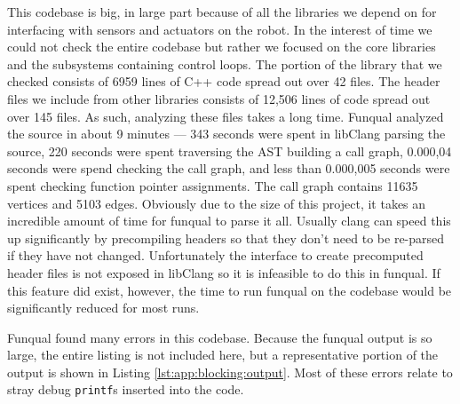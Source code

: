 This codebase is big, in large part because of all the libraries we depend on for interfacing with sensors and actuators on the robot.  In the interest of time we could not check the entire codebase but rather we focused on the core libraries and the subsystems containing control loops.  The portion of the library that we checked consists of 6959 lines of C++ code spread out over 42 files.  The header files we include from other libraries consists of 12,506 lines of code spread out over 145 files.  As such, analyzing these files takes a long time.  Funqual analyzed the source in about 9 minutes --- 343 seconds were spent in libClang parsing the source, 220 seconds were spent traversing the AST building a call graph, 0.000,04 seconds were spend checking the call graph, and less than 0.000,005 seconds were spent checking function pointer assignments.  The call graph contains 11635 vertices and 5103 edges.  Obviously due to the size of this project, it takes an incredible amount of time for funqual to parse it all.  Usually clang can speed this up significantly by precompiling headers so that they don't need to be re-parsed if they have not changed.  Unfortunately the interface to create precomputed header files is not exposed in libClang so it is infeasible to do this in funqual.  If this feature did exist, however, the time to run funqual on the codebase would be significantly reduced for most runs.

Funqual found many errors in this codebase.  Because the funqual output is so large, the entire listing is not included here, but a representative portion of the output is shown in Listing \ref{lst:app:blocking:output}.  Most of these errors relate to stray debug \lstinline{printf}s inserted into the code.  

